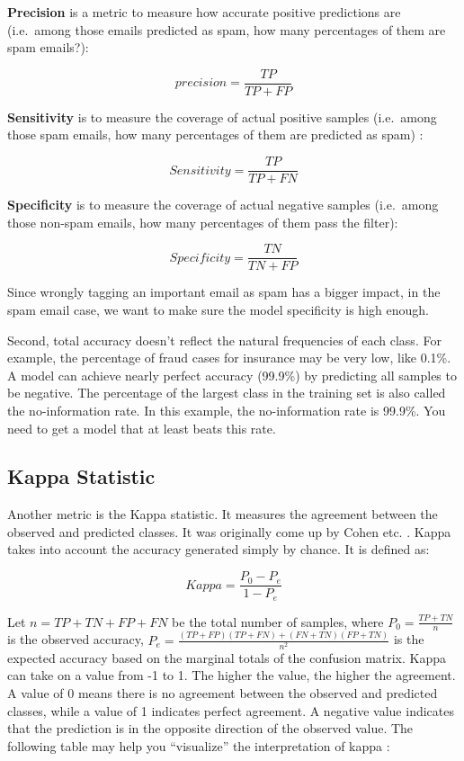 \documentclass[12pt,]{krantz}
\begin{document}
\textbf{Precision} is a metric to measure how accurate positive predictions are (i.e.~among those emails predicted as spam, how many percentages of them are spam emails?):

\[precision = \frac{TP}{TP+FP}\]

\textbf{Sensitivity} is to measure the coverage of actual positive samples (i.e.~among those spam emails, how many percentages of them are predicted as spam) :

\[Sensitivity = \frac{TP}{TP+FN}\]

\textbf{Specificity} is to measure the coverage of actual negative samples (i.e.~among those non-spam emails, how many percentages of them pass the filter):

\[Specificity = \frac{TN}{TN+FP}\]

Since wrongly tagging an important email as spam has a bigger impact, in the spam email case, we want to make sure the model specificity is high enough.

Second, total accuracy doesn't reflect the natural frequencies of each class. For example, the percentage of fraud cases for insurance may be very low, like 0.1\%. A model can achieve nearly perfect accuracy (99.9\%) by predicting all samples to be negative. The percentage of the largest class in the training set is also called the no-information rate. In this example, the no-information rate is 99.9\%. You need to get a model that at least beats this rate.

\hypertarget{kappa-statistic}{%
\subsection{Kappa Statistic}\label{kappa-statistic}}

Another metric is the Kappa statistic. It measures the agreement between the observed and predicted classes. It was originally come up by Cohen etc. \citep{Cohen1960}. Kappa takes into account the accuracy generated simply by chance. It is defined as:

\[Kappa=\frac{P_{0}-P_{e}}{1-P_{e}}\]

Let \(n=TP+TN+FP+FN\) be the total number of samples, where \(P_{0}=\frac{TP+TN}{n}\) is the observed accuracy, \(P_{e}=\frac{(TP+FP)(TP+FN)+(FN+TN)(FP+TN)}{n^{2}}\) is the expected accuracy based on the marginal totals of the confusion matrix. Kappa can take on a value from -1 to 1. The higher the value, the higher the agreement. A value of 0 means there is no agreement between the observed and predicted classes, while a value of 1 indicates perfect agreement. A negative value indicates that the prediction is in the opposite direction of the observed value. The following table may help you ``visualize'' the interpretation of kappa \citep{landis1977}:
\end{document}
